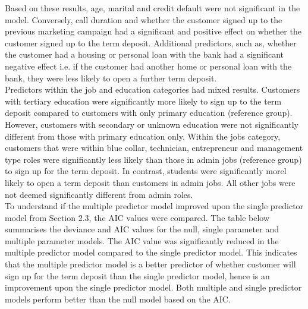 \documentclass[11pt]{article}
\begin{document}
{Based on these results, age, marital and credit default were not significant in the model. Conversely, call duration and whether the customer signed up to the previous marketing campaign had a significant and positive effect on whether the customer signed up to the term deposit. Additional predictors, such as, whether the customer had a housing or personal loan with the bank had a significant negative effect i.e. if the customer had another home or personal loan with the bank, they were less likely to open a further term deposit.\\

Predictors within the job and education categories had mixed results. Customers with tertiary education were significantly more likely to sign up to the term deposit compared to customers with only primary education (reference group). However, customers with secondary or unknown education were not significantly different from those with primary education only. Within the jobs category, customers that were within blue collar, technician, entrepreneur and management type roles were significantly less likely than those in admin jobs (reference group) to sign up for the term deposit. In contrast, students were significantly morel likely to open a term deposit than customers in admin jobs. All other jobs were not deemed significantly different from admin roles.\\

To understand if the multiple predictor model improved upon the single predictor model from Section 2.3, the AIC values were compared. The table below summarises the deviance and AIC values for the null, single parameter and multiple parameter models. The AIC value was significantly reduced in the multiple predictor model compared to the single predictor model. This indicates that the multiple predictor model is a better predictor of whether customer will sign up for the term deposit than the single predictor model, hence is an improvement upon the single predictor model. Both multiple and single predictor models perform better than the null model based on the AIC.\\


}
\end{document}
